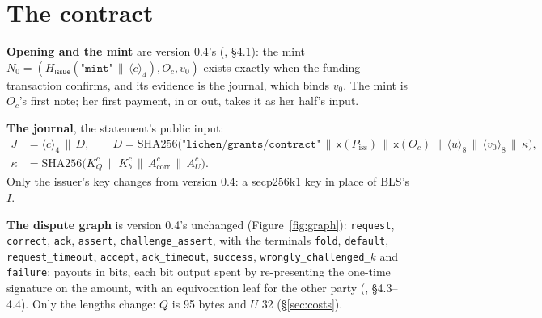 \documentclass[11pt]{article}
\theoremstyle{plain}
\theoremstyle{definition}
\newcommand{\tx}[1]{\texttt{#1}}
\newcommand{\be}[2]{\langle #1\rangle_{#2}}
\newcommand{\xo}[1]{\mathsf{x}(#1)}
\newcommand{\Ht}[1]{H_{\textsf{#1}}}
\newcommand{\Piss}{P_{\mathrm{iss}}}
\newcommand{\Oc}{O_c}
\newcommand{\KQ}{K_{Q}^{c}}
\newcommand{\Kb}{K_{b}^{c}}
\newcommand{\Acorr}{A_{\mathrm{corr}}^{c}}
\newcommand{\AU}{A_{U}^{c}}
\begin{document}
\section{The contract}\label{sec:contract}

\textbf{Opening and the mint} are version 0.4's (\cite{grants04},
\S4.1): the mint $N_0 = (\Ht{issue}(\texttt{"mint"} \,\|\, \be{c}{4}),
\Oc, v_0)$ exists exactly when the funding transaction confirms, and
its evidence is the journal, which binds $v_0$. The mint is $\Oc$'s
first note; her first payment, in or out, takes it as her half's input.

\textbf{The journal}, the statement's public input:
\begin{align*}
  J &= \be{c}{4} \,\|\, D,\qquad
  D = \mathrm{SHA256}\big(\texttt{"lichen/grants/contract"} \,\|\,
  \xo{\Piss} \,\|\, \xo{\Oc} \,\|\, \be{u}{8} \,\|\, \be{v_0}{8} \,\|\,
  \kappa\big),\\
  \kappa &= \mathrm{SHA256}\big(\KQ \,\|\, \Kb \,\|\, \Acorr \,\|\, \AU\big).
\end{align*}
Only the issuer's key changes from version 0.4: a secp256k1 key in
place of BLS's $I$.

\textbf{The dispute graph} is version 0.4's unchanged
(Figure~\ref{fig:graph}): \tx{request}, \tx{correct}, \tx{ack},
\tx{assert}, \tx{challenge\_assert}, with the terminals \tx{fold},
\tx{default}, \tx{request\_timeout}, \tx{accept}, \tx{ack\_timeout},
\tx{success}, \tx{wrongly\_challenged\_$k$} and \tx{failure}; payouts in
bits, each bit output spent by re-presenting the one-time signature on
the amount, with an equivocation leaf for the other party
(\cite{grants04}, \S4.3--4.4). Only the lengths change: $Q$ is 95 bytes
and $U$ 32 (\S\ref{sec:costs}).
\end{document}
